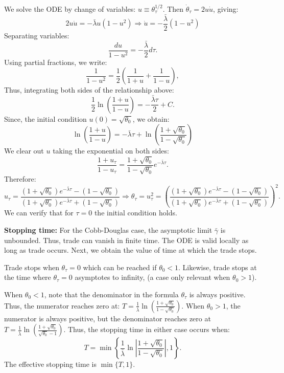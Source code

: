 We solve the ODE by change of variables: $u \equiv \theta_{\tau}^{1/2}$. Then $\dot{\theta}_{\tau} = 2u\dot{u}$, giving:
\[
2u\dot{u} = -\bar{\lambda}u(1-u^2)
\Rightarrow
\dot{u} = -\frac{\bar{\lambda}}{2}(1-u^2)
\]
Separating variables:
\[
\frac{du}{1-u^2} = -\frac{\bar{\lambda}}{2}d\tau.
\]
Using partial fractions, we write:
\[
\frac{1}{1-u^2} = \frac{1}{2}\left(\frac{1}{1+u} + \frac{1}{1-u}\right),
\]
Thus, integrating both sides of the relationship above:
\[
\frac{1}{2}\ln\left(\frac{1+u}{1-u}\right) = -\frac{\bar{\lambda}\tau}{2} + C.
\]
Since, the initial condition $u(0) = \sqrt{\theta_0}$, we obtain:
\[
\ln\left(\frac{1+u}{1-u}\right) = -\bar{\lambda}\tau + \ln\left(\frac{1+\sqrt{\theta_0}}{1-\sqrt{\theta_0}}\right)
\]
We clear out $u$ taking the exponential on both sides:
\[
\frac{1+u_\tau}{1-u_\tau} = \frac{1+\sqrt{\theta_0}}{1-\sqrt{\theta_0}}e^{-\bar{\lambda}\tau}.
\]
Therefore:
\[
u_{\tau} = \frac{(1+\sqrt{\theta_0})e^{-\bar{\lambda}\tau} - (1-\sqrt{\theta_0})}{(1+\sqrt{\theta_0})e^{-\bar{\lambda}\tau} + (1-\sqrt{\theta_0})}
\Rightarrow
\theta_{\tau} = u_{\tau}^2 = \left(\frac{(1+\sqrt{\theta_0})e^{-\bar{\lambda}\tau} - (1-\sqrt{\theta_0})}{(1+\sqrt{\theta_0})e^{-\bar{\lambda}\tau} + (1-\sqrt{\theta_0})}\right)^2.
\]
We can verify that for $\tau=0$ the initial condition holds. 

\textbf{Stopping time:} For the Cobb-Douglas case, the asymptotic limit $\bar{\gamma}$ is unbounded. Thus, trade can vanish in finite time. The ODE is valid locally as long as trade occurs. Next, we obtain the value of time at which the trade stops. 

 Trade stops when $\theta_{\tau} = 0$ which can be reached if $\theta_0 < 1$. Likewise, trade stops at the time where $\theta_{\tau} = 0$ asymptotes to infinity, (a case only relevant when $\theta_0 > 1$). 

 When $\theta_0<1$, note that the denominator in the formula $\theta_{\tau}$ is always positive. Thus, the numerator reaches zero at:
 $T = \frac{1}{\bar{\lambda}}\ln\left(\frac{1+\sqrt{\theta_0}}{1-\sqrt{\theta_0}}\right)$. When $\theta_0>1$, the numerator is always positive, but the denominator reaches zero at $T = \frac{1}{\bar{\lambda}}\ln\left(\frac{1+\sqrt{\theta_0}}{\sqrt{\theta_0}-1}\right).$ Thus, the stopping time in either case occurs when:
\[
T = \min\left\{ \frac{1}{\bar{\lambda}}\ln\left|\frac{1+\sqrt{\theta_0}}{1-\sqrt{\theta_0}}\right|,1\right\}.
\]
The effective stopping time is $\min\{T, 1\}$.

